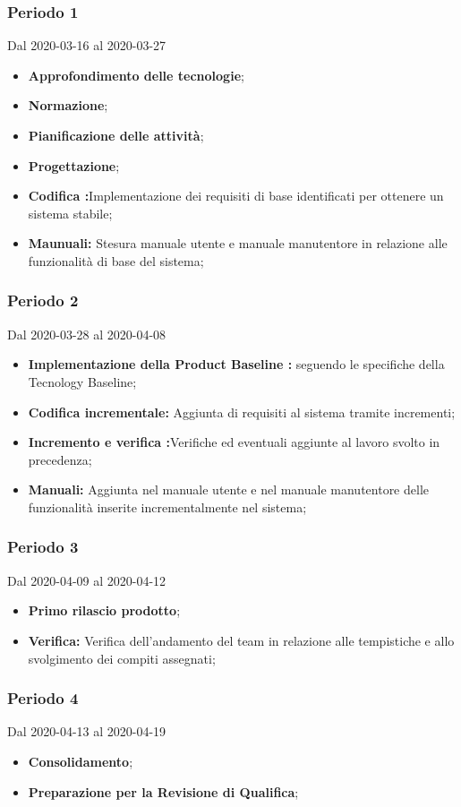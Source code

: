 \subsubsection{Periodo 1} 
Dal 2020-03-16 al 2020-03-27\\
\begin{itemize}
	\item \textbf{Approfondimento delle tecnologie};
	\item \textbf{Normazione};
	\item \textbf{Pianificazione delle attività};
	\item \textbf{Progettazione};
	\item \textbf{Codifica :}Implementazione dei requisiti di base identificati per ottenere un sistema stabile;
	\item \textbf{Maunuali: }Stesura manuale utente e manuale manutentore in relazione alle funzionalità di base del sistema;
\end{itemize}
\subsubsection{Periodo 2} 
Dal 2020-03-28 al 2020-04-08\\
\begin{itemize}
	\item \textbf{Implementazione della Product Baseline :} seguendo le specifiche della Tecnology Baseline;
	\item \textbf{Codifica incrementale: }Aggiunta di requisiti al sistema tramite incrementi;
	\item \textbf{Incremento e verifica :}Verifiche ed eventuali aggiunte al lavoro svolto in precedenza;
	\item \textbf{Manuali: }Aggiunta nel manuale utente e nel manuale manutentore delle funzionalità inserite incrementalmente nel sistema;
\end{itemize}
\subsubsection{Periodo 3}
Dal 2020-04-09 al 2020-04-12\\
\begin{itemize}
	\item \textbf{Primo rilascio prodotto};
	\item \textbf{Verifica: }Verifica dell'andamento del team in relazione alle tempistiche e allo svolgimento dei compiti assegnati;
\end{itemize}
\subsubsection{Periodo 4} 
Dal 2020-04-13 al 2020-04-19\\
\begin{itemize}
	\item \textbf{Consolidamento};
	\item \textbf{Preparazione per la Revisione di Qualifica};
\end{itemize}
